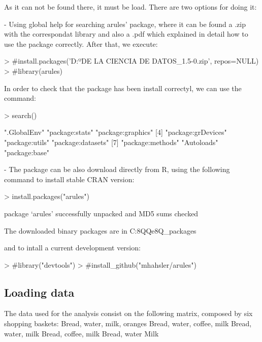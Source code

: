\documentclass[a4paper]{article}
\begin{document}
As it can not be found there, it must be load. There are two options for doing it:

- Using global help for searching arules' package, where it can be found a .zip with the correspondat library
and also a .pdf which explained in detail how to use the package correctly. After that, we execute:

\begin{Schunk}
\begin{Sinput}
> #install.packages('D:\UNIVERSIDAD\4º\FUNDAMENTOS DE LA CIENCIA DE DATOS\arules_1.5-0.zip', repos=NULL)
> #library(arules)
\end{Sinput}
\end{Schunk}

In order to check that the package has been install correctyl, we can use the command:
\begin{Schunk}
\begin{Sinput}
> search()
\end{Sinput}
\begin{Soutput}
[1] ".GlobalEnv"        "package:stats"     "package:graphics" 
[4] "package:grDevices" "package:utils"     "package:datasets" 
[7] "package:methods"   "Autoloads"         "package:base"     
\end{Soutput}
\end{Schunk}

- The package can be also download directly from R, using the following command to install stable CRAN version:
\begin{Schunk}
\begin{Sinput}
> install.packages("arules")
\end{Sinput}
\begin{Soutput}
package ‘arules’ successfully unpacked and MD5 sums checked

The downloaded binary packages are in
	C:\Users\lperez\AppData\Local\Temp\Rtmp8QQe8Q\downloaded_packages
\end{Soutput}
\end{Schunk}
and to intall a current development version:
\begin{Schunk}
\begin{Sinput}
> #library("devtools")
> #install_github("mhahsler/arules")
\end{Sinput}
\end{Schunk}

	\subsection*{Loading data}
The data used for the analysis consist on the following matrix, composed by six shopping baskets:
{Bread, water,  milk,   oranges}
{Bread, water,  coffee, milk}
{Bread, water,  milk}
{Bread, coffee, milk}
{Bread, water}
{Milk}
\end{document}

